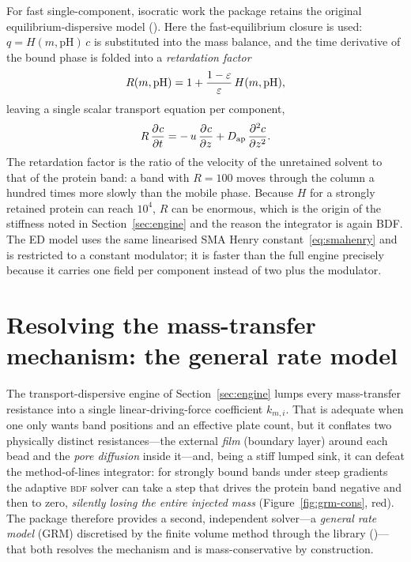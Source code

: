 For fast single-component, isocratic work the package retains the original
equilibrium-dispersive model (). Here the
fast-equilibrium closure is used: $q = H(m,\mathrm{pH})\,c$ is substituted into
the mass balance, and the time derivative of the bound phase is folded into a
\emph{retardation factor}
%
\begin{equation}
R(m,\mathrm{pH}) = 1 + \frac{1-\eps}{\eps}\,H(m,\mathrm{pH}),
\label{eq:retard}
\end{equation}
%
leaving a single scalar transport equation per component,
%
\begin{equation}
R\,\pdv{c}{t} = -\,u\,\pdv{c}{z} + D_{\mathrm{ap}}\,\pdv[2]{c}{z}.
\label{eq:ed}
\end{equation}
%
The retardation factor is the ratio of the velocity of the unretained solvent to
that of the protein band: a band with $R=100$ moves through the column a hundred
times more slowly than the mobile phase. Because $H$ for a strongly retained
protein can reach $10^4$, $R$ can be enormous, which is the origin of the
stiffness noted in Section~\ref{sec:engine} and the reason the integrator is
again BDF. The ED model uses the same linearised SMA Henry
constant~\eqref{eq:smahenry} and is restricted to a constant modulator; it is
faster than the full engine precisely because it carries one field per component
instead of two plus the modulator.

\section{Resolving the mass-transfer mechanism: the general rate model}
\label{sec:grm}

The transport-dispersive engine of Section~\ref{sec:engine} lumps every
mass-transfer resistance into a single linear-driving-force coefficient
$k_{m,i}$. That is adequate when one only wants band positions and an effective
plate count, but it conflates two physically distinct resistances---the external
\emph{film} (boundary layer) around each bead and the \emph{pore diffusion}
inside it---and, being a stiff lumped sink, it can defeat the method-of-lines
integrator: for strongly bound bands under steep gradients the adaptive
\textsc{bdf} solver can take a step that drives the protein band negative and
then to zero, \emph{silently losing the entire injected mass}
(Figure~\ref{fig:grm-cons}, red). The package therefore provides a second,
independent solver---a \emph{general rate model} (GRM) discretised by the finite
volume method through the  library
()---that both resolves the mechanism and is
mass-conservative by construction.

